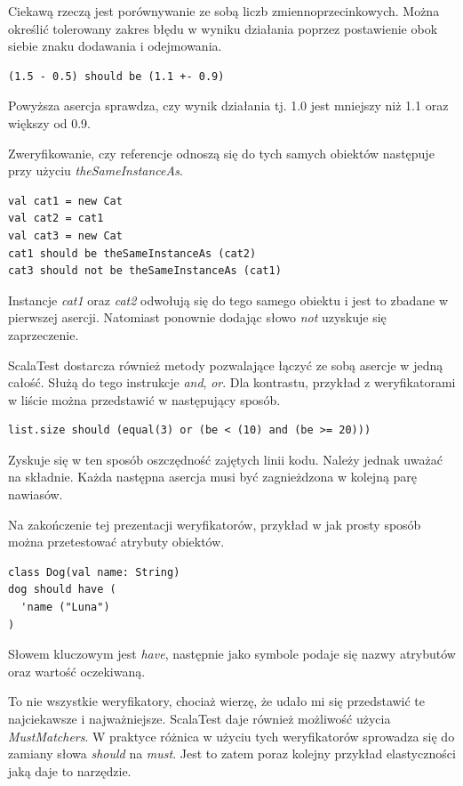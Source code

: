 \documentclass[brudnopis]{xmgr}
\begin{document}
Ciekawą rzeczą jest porównywanie ze sobą liczb zmiennoprzecinkowych. Można określić tolerowany zakres błędu w wyniku działania poprzez postawienie obok siebie znaku dodawania i odejmowania.

\begin{verbatim}
(1.5 - 0.5) should be (1.1 +- 0.9)
\end{verbatim}

Powyższa asercja sprawdza, czy wynik działania tj. 1.0 jest mniejszy niż 1.1 oraz większy od 0.9.

Zweryfikowanie, czy referencje odnoszą się do tych samych obiektów następuje przy użyciu \emph{theSameInstanceAs}.

\begin{verbatim}
val cat1 = new Cat
val cat2 = cat1
val cat3 = new Cat	
cat1 should be theSameInstanceAs (cat2)
cat3 should not be theSameInstanceAs (cat1)
\end{verbatim}

Instancje \emph{cat1} oraz \emph{cat2} odwołują się do tego samego obiektu i jest to zbadane w pierwszej asercji. Natomiast ponownie dodając słowo \emph{not} uzyskuje się zaprzeczenie.

ScalaTest dostarcza również metody pozwalające łączyć ze sobą asercje w jedną całość. Służą do tego instrukcje \emph{and}, \emph{or}. Dla kontrastu, przykład z weryfikatorami w liście można przedstawić w następujący sposób.

\begin{verbatim}
list.size should (equal(3) or (be < (10) and (be >= 20)))
\end{verbatim}

Zyskuje się w ten sposób oszczędność zajętych linii kodu. Należy jednak uważać na składnie. Każda następna asercja musi być zagnieżdzona w kolejną parę nawiasów.

Na zakończenie tej prezentacji weryfikatorów, przykład w jak prosty sposób można przetestować atrybuty obiektów.

\begin{verbatim}
class Dog(val name: String)
dog should have (
  'name ("Luna")
)
\end{verbatim}

Słowem kluczowym jest \emph{have}, następnie jako symbole podaje się nazwy atrybutów oraz wartość oczekiwaną.

To nie wszystkie weryfikatory, chociaż wierzę, że udało mi się przedstawić te najciekawsze i najważniejsze. ScalaTest daje również możliwość użycia \emph{MustMatchers}. W praktyce różnica w użyciu tych weryfikatorów sprowadza się do zamiany słowa \emph{should} na \emph{must}. Jest to zatem poraz kolejny przykład elastyczności jaką daje to narzędzie.
\end{document}
